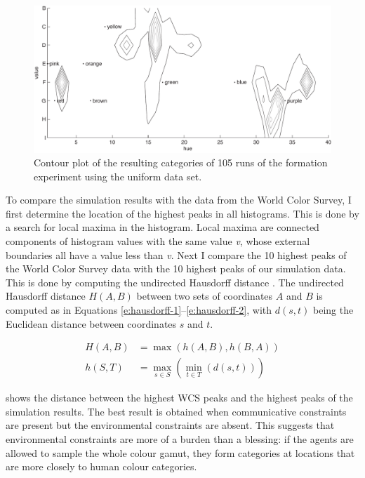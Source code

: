 \begin{figure}[htbp]
\centering
  \includegraphics[width=.85\textwidth]{./experiments/figures/contour-uniform-language}
  \caption{Contour plot of the resulting categories of 105 runs of the
    formation experiment using the uniform data set.}
\label{f:contour-uniform-language}
\end{figure}

To compare the simulation results with the data from the World Color
Survey, I first determine the location of the highest peaks in all
histograms. This is done by a search for local maxima in the
histogram. Local maxima are connected components of histogram values
with the same value \emph{v}, whose external boundaries all have a
value less than \emph{v}. Next I compare the 10 highest peaks of the
World Color Survey data with the 10 highest peaks of our simulation
data. This is done by computing the undirected Hausdorff distance
\citep{rucklidge97efficiently}. The undirected Hausdorff distance
$H(A, B)$ between two sets of coordinates $A$ and $B$ is computed as
in Equations \ref{e:hausdorff-1}--\ref{e:hausdorff-2}, with $d(s, t)$
being the Euclidean distance between coordinates $s$ and $t$.

\begin{align}
H(A, B)& = \max (h(A,B), h(B,A)) 
\label{e:hausdorff-1} \\
h(S, T)& = \max_{s \in S} \left(\min_{t \in T} \left(d\left(s, t\right)\right)\right)
\label{e:hausdorff-2}
\end{align}

 shows the distance between the
highest WCS peaks and the highest peaks of the simulation results. The
best result is obtained when communicative constraints are present but
the environmental constraints are absent. This suggests that
environmental constraints are more of a burden than a blessing:
if the agents are allowed to sample the whole colour gamut, they form
categories at locations that are more closely to human colour
categories.

